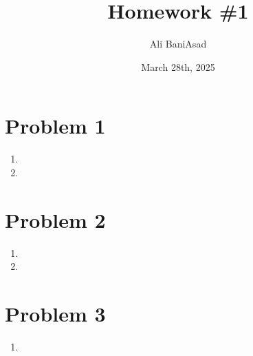 \documentclass[12]{fphw}
\title{Homework \#1} %
\author{Ali BaniAsad} %
\date{March 28th, 2025} %
\institute{Sharif University of Technology \\ Institute of Aerospace} %
\begin{document}
	
	\maketitle %
	\section*{Problem 1}
	\begin{enumerate}[label=(\alph*)]
		\item 
		
		\item 
		
	\end{enumerate}
	\section*{Problem 2}
	\begin{enumerate}[label=(\alph*)]
		\item 
		
		\item 
		
	\end{enumerate}
	\section*{Problem 3}
	\begin{enumerate}[label=(\alph*)]
		\item
		
	\end{enumerate}


	
\end{document}

